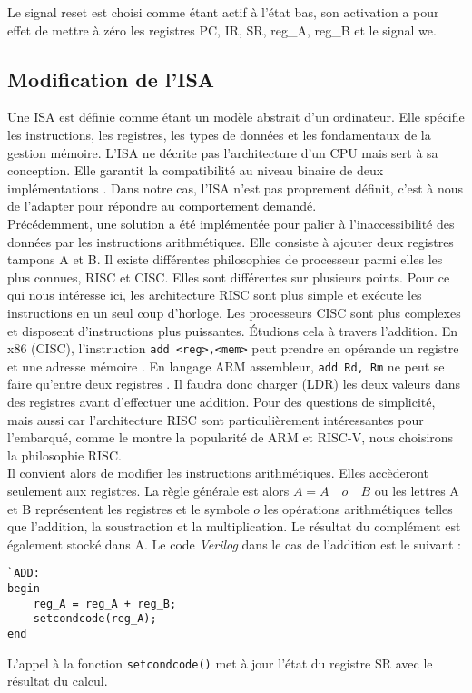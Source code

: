 Le signal reset est choisi comme étant actif à l'état bas, son activation a pour effet de mettre à zéro les registres PC, IR, SR, reg\_A, reg\_B et le signal we.

\subsection{Modification de l'ISA}
Une ISA est définie comme étant un modèle abstrait d'un ordinateur.
Elle spécifie les instructions, les registres, les types de données et les fondamentaux de la gestion mémoire.
L'ISA ne décrite pas l'architecture d'un \gls{CPU} mais sert à sa conception.
Elle garantit la compatibilité au niveau binaire de deux implémentations \cite{ISA_wiki}.
Dans notre cas, l'ISA n'est pas proprement définit, c'est à nous de l'adapter pour répondre au comportement demandé. \\
Précédemment, une solution a été implémentée pour palier à l'inaccessibilité des données par les instructions arithmétiques.
Elle consiste à ajouter deux registres tampons A et B.
Il existe différentes philosophies de processeur parmi elles les plus connues, \gls{RISC} et \gls{CISC}.
Elles sont différentes sur plusieurs points. 
Pour ce qui nous intéresse ici, les architecture \gls{RISC} sont plus simple et exécute les instructions en un seul coup d'horloge. Les processeurs \gls{CISC} sont plus complexes et disposent d'instructions plus puissantes. 
Étudions cela à travers l'addition. En x86 (\gls{CISC}), l'instruction \texttt{add <reg>,<mem>} peut prendre en opérande un registre et une adresse mémoire \cite{x86_asm}. 
En langage ARM assembleur, \texttt{add Rd, Rm} ne peut se faire qu'entre deux registres \cite{ARM_ASM}.
Il faudra donc charger (LDR) les deux valeurs dans des registres avant d'effectuer une addition.
Pour des questions de simplicité, mais aussi car l'architecture \gls{RISC} sont particulièrement intéressantes pour l'embarqué, comme le montre la popularité de ARM et RISC-V, nous choisirons la philosophie \gls{RISC}. \\
Il convient alors de modifier les instructions arithmétiques.
Elles accèderont seulement aux registres.
La règle générale est alors $A = A \quad o \quad B$ ou les lettres A et B représentent les registres et le symbole $o$ les opérations arithmétiques telles que l'addition, la soustraction et la multiplication. 
Le résultat du complément est également stocké dans A.
Le code \textit{Verilog} dans le cas de l'addition est le suivant :
\begin{lstlisting}[style=vhdl]
`ADD:
begin
    reg_A = reg_A + reg_B;
    setcondcode(reg_A);
end
\end{lstlisting}
L'appel à la fonction \texttt{setcondcode()} met à jour l'état du registre SR avec le résultat du calcul. \\
\gap

